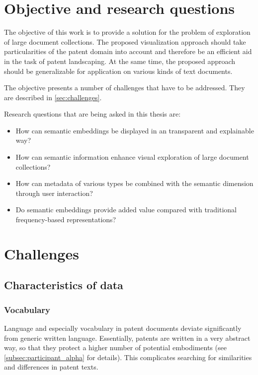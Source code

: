 \section{Objective and research questions}
\label{sec:objectives}


The objective of this work is to provide a solution for the problem of exploration of large document collections.
The proposed visualization approach should take particularities of the patent domain into account and therefore be an efficient aid in the task of patent landscaping.
At the same time, the proposed approach should be generalizable for application on various kinds of text documents.

The objective presents a number of challenges that have to be addressed. 
They are described in \autoref{sec:challenges}.

Research questions that are being asked in this thesis are: 
\begin{itemize}
\item How can semantic embeddings be displayed in an transparent and explainable way?
\item How can semantic information enhance visual exploration of large document collections?
\item How can metadata of various types be combined with the semantic dimension through user interaction?
\item Do semantic embeddings provide added value compared with traditional frequency-based representations?
\end{itemize}

\section{Challenges}
\label{sec:challenges}

\subsection{Characteristics of data}
\subsubsection{Vocabulary}

Language and especially vocabulary in patent documents deviate significantly from generic written language.
Essentially, patents are written in a very abstract way, so that they protect a higher number of potential embodiments (see \autoref{subsec:participant_alpha} for details).
This complicates searching for similarities and differences in patent texts.


